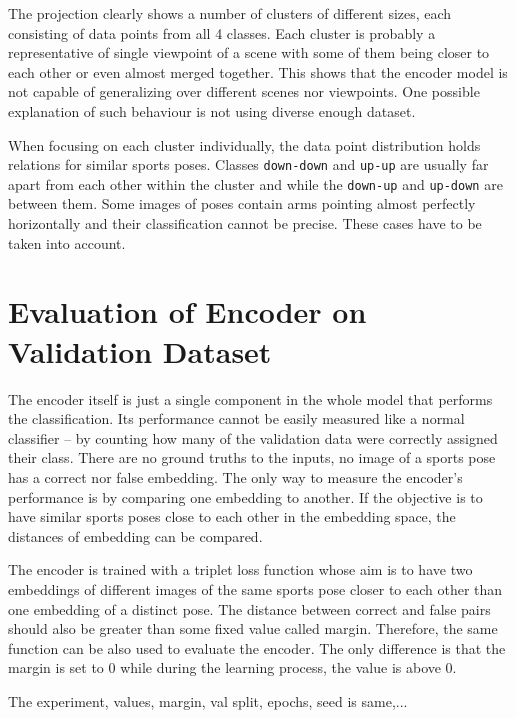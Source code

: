 The projection clearly shows a number of clusters of different sizes, each consisting of data points from all 4 classes. Each cluster is probably a representative of single viewpoint of a scene with some of them being closer to each other or even almost merged together. This shows that the encoder model is not capable of generalizing over different scenes nor viewpoints. One possible explanation of such behaviour is not using diverse enough dataset.

When focusing on each cluster individually, the data point distribution holds relations for similar sports poses. Classes \texttt{down-down} and \texttt{up-up} are usually far apart from each other within the cluster and while the \texttt{down-up} and \texttt{up-down} are between them. Some images of poses contain arms pointing almost perfectly horizontally and their classification cannot be precise. These cases have to be taken into account.

\section{\label{sec:evaluate-encoder}Evaluation of Encoder on Validation Dataset}

The encoder itself is just a single component in the whole model that performs the classification. Its performance cannot be easily measured like a normal classifier -- by counting how many of the validation data were correctly assigned their class. There are no ground truths to the inputs, no image of a sports pose has a correct nor false embedding. The only way to measure the encoder's performance is by comparing one embedding to another. If the objective is to have similar sports poses close to each other in the embedding space, the distances of embedding can be compared.

The encoder is trained with a triplet loss function whose aim is to have two embeddings of different images of the same sports pose closer to each other than one embedding of a distinct pose. The distance between correct and false pairs should also be greater than some fixed value called margin. Therefore, the same function can be also used to evaluate the encoder. The only difference is that the margin is set to 0 while during the learning process, the value is above 0.

The experiment, values, margin, val split, epochs, seed is same,...
\blindtext

